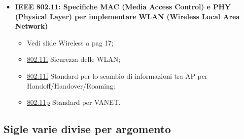 \begin{itemize}
\item{\textbf{IEEE 802.11: Specifiche MAC (Media Access Control) e PHY (Physical Layer) per implementare WLAN (Wireless Local Area Network)}}

\begin{itemize}

\item Vedi slide Wireless a pag 17;
\item{\underline{802.11i}} Sicurezza delle WLAN;
\item{\underline{802.11f}} Standard per lo scambio di informazioni tra AP per Handoff/Handover/Roaming;
\item{\underline{802.11p}} Standard per VANET.

\end{itemize}

\end{itemize}


\subsection{Sigle varie divise per argomento}


